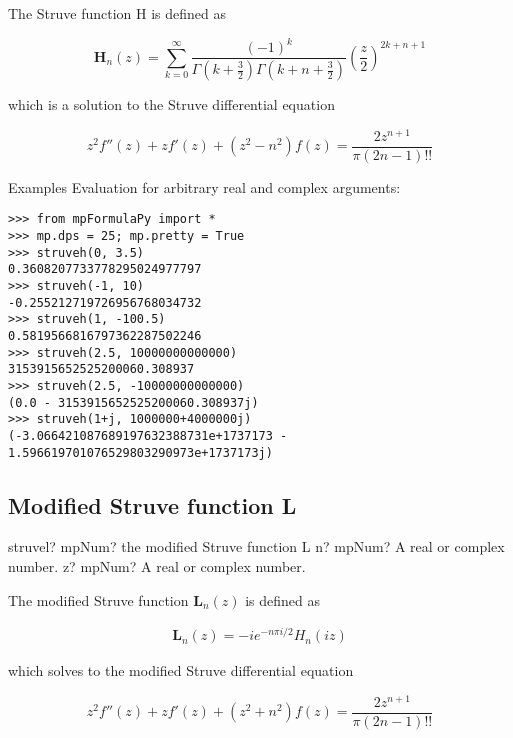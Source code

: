The Struve function H is defined as

\begin{equation}
\textbf{H}_n(z)=\sum_{k=0}^{\infty} \frac{(-1)^k}{\Gamma\left(k+\frac{3}{2}\right)\Gamma\left(k+n+\frac{3}{2}\right)}\left(\frac{z}{2}\right)^{2k+n+1}
\end{equation}

which is a solution to the Struve differential equation

\begin{equation}
z^2f''(z)+zf'(z)+(z^2-n^2)f(z)=\frac{2z^{n+1}}{\pi(2n-1)!!}
\end{equation}

Examples
Evaluation for arbitrary real and complex arguments:

\begin{lstlisting}
>>> from mpFormulaPy import *
>>> mp.dps = 25; mp.pretty = True
>>> struveh(0, 3.5)
0.3608207733778295024977797
>>> struveh(-1, 10)
-0.255212719726956768034732
>>> struveh(1, -100.5)
0.5819566816797362287502246
>>> struveh(2.5, 10000000000000)
3153915652525200060.308937
>>> struveh(2.5, -10000000000000)
(0.0 - 3153915652525200060.308937j)
>>> struveh(1+j, 1000000+4000000j)
(-3.066421087689197632388731e+1737173 - 1.596619701076529803290973e+1737173j)
\end{lstlisting}



\subsection{Modified Struve function L}

\begin{mpFunctionsExtract}
	\mpFunctionTwo
	{struvel? mpNum? the modified Struve function L}
	{n? mpNum? A real or complex number.}
	{z? mpNum? A real or complex number.}	
\end{mpFunctionsExtract}

\vpara
The modified Struve function $\textbf{L}_n(z)$ is defined as

\begin{eqnarray}
\textbf{L}_n(z)=-i e^{-n\pi i/2}H_n(iz)
\end{eqnarray}

which solves to the modified Struve differential equation

\begin{equation}
z^2f''(z)+zf'(z)+(z^2+n^2)f(z)=\frac{2z^{n+1}}{\pi(2n-1)!!}
\end{equation}


